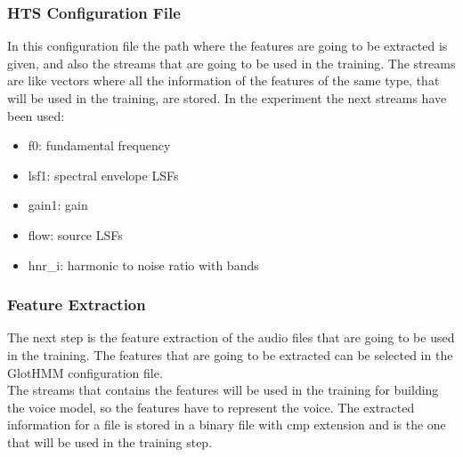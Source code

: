 \subsubsection{HTS Configuration File}\label{htscfile}
In this configuration file the path where the features are going to be extracted is given, and also the streams that are going to be used in the training. The streams are like vectors where all the information of the features of the same type, that will be used in the training, are stored. In the experiment the next streams have been used:
\begin{itemize}
	\item f0: fundamental frequency
	\item lsf1: spectral envelope LSFs
	\item gain1: gain
	\item flow: source LSFs
	\item hnr\_i: harmonic to noise ratio with bands
\end{itemize}
\subsubsection{Feature Extraction}\label{fea}
The next step is the feature extraction of the audio files that are going to be used in the training. The features that are going to be extracted can be selected in the GlotHMM configuration file.\\
The streams that contains the features will be used in the training for building the voice model, so the features have to represent the voice.
The extracted information for a file is stored in a binary file with cmp extension and is the one that will be used in the training step.

